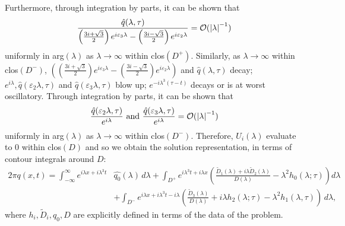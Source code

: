 Furthermore, through integration by parts, it can be shown that 
$$\frac{\hat{q}(\lambda,\tau)}{\left(\frac{3i + \sqrt{3}}{2}\right)e^{i\varepsilon_3\lambda} - \left(\frac{3i - \sqrt{3}}{2}\right)e^{i\varepsilon_2\lambda}} = \mathcal{O}(\left\lvert\lambda\right\rvert^{-1})$$
uniformly in arg$(\lambda)$ as $\lambda \rightarrow \infty$ within clos$(D^+)$.
Similarly, as $\lambda \rightarrow \infty$ within clos$(D^-)$,
\newline
$\left(\left(\frac{3i + \sqrt{3}}{2}\right)e^{i\varepsilon_3\lambda} - \left(\frac{3i - \sqrt{3}}{2}\right)e^{i\varepsilon_2\lambda}\right)$ and $\hat{q}(\lambda,\tau)$ decay; $e^{i\lambda}, \hat{q}(\varepsilon_2\lambda,\tau)$ and $\hat{q}(\varepsilon_3\lambda,\tau)$ blow up; $e^{-i \lambda^3 (\tau - t)}$ decays or is at worst oscillatory.
Through integration by parts, it can be shown that 
$$\frac{\hat{q}(\varepsilon_2\lambda,\tau)}{e^{i\lambda}} \mbox{ and } \frac{\hat{q}(\varepsilon_3\lambda,\tau)}{e^{i\lambda}} = \mathcal{O}(\left\lvert\lambda\right\rvert^{-1})$$
uniformly in arg$(\lambda)$ as $\lambda \rightarrow \infty$ within clos$(D^-)$.
Therefore, $U_i(\lambda)$ evaluate to $0$ within clos$(D)$ and so we obtain the solution representation, in terms of contour integrals around $D:$
\begin{equation*}\label{SRtau}
\begin{aligned}
2\pi q(x, t) = \int_{-\infty}^\infty e^{i\lambda x + i \lambda^3 t}&\hat{q_0}(\lambda)\,d\lambda + \int_{D^+} e^{i \lambda^3 t+i\lambda x}\left( \frac{\widetilde{D}_1(\lambda)+i \lambda\widetilde{D}_2(\lambda)}{D(\lambda)} - \lambda^2 h_0(\lambda; \tau) \right)d\lambda \\
&+\int_{D^-} e^{i\lambda x+i \lambda^3 t-i\lambda} \left(\frac{\widetilde{D}_3(\lambda)}{D(\lambda)} + i \lambda h_2(\lambda; \tau) - \lambda^2 h_1(\lambda, \tau)\right)\,d\lambda,
\end{aligned}\tag{SR$\tau$}
\end{equation*} 
where $h_i, \widetilde{D}_i, q_0, D$ are explicitly defined in terms of the data of the problem.